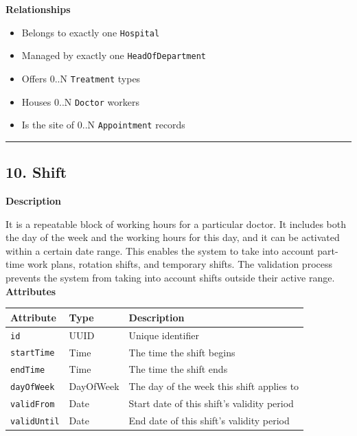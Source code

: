 \documentclass[12pt, a4paper]{article}
\begin{document}
\textbf{Relationships}

\begin{itemize}
    \item Belongs to exactly one \texttt{Hospital}
    \item Managed by exactly one \texttt{HeadOfDepartment}
    \item Offers 0..N \texttt{Treatment} types
    \item Houses 0..N \texttt{Doctor} workers
    \item Is the site of 0..N \texttt{Appointment} records
\end{itemize}

\par\medskip\hrule\medskip

\subsection{10. Shift}\label{sec:10-shift}

\textbf{Description}

It is a repeatable block of working hours for a particular doctor. It includes both the day of the week and the working hours for this day, and it can be activated within a certain date range. This enables the system to take into account part-time work plans, rotation shifts, and temporary shifts. The validation process prevents the system from taking into account shifts outside their active range.
\textbf{Attributes}

\begin{center}
\small
\renewcommand{\arraystretch}{1.35}
\begin{tabularx}{\textwidth}{|>{\raggedright\arraybackslash}p{3.4cm}|>{\raggedright\arraybackslash}p{3.3cm}|Y|}
\hline
{}
\textbf{Attribute} & \textbf{Type} & \textbf{Description} \\ \hline
\texttt{id} & UUID & Unique identifier \\ \hline
\texttt{startTime} & Time & The time the shift begins \\ \hline
\texttt{endTime} & Time & The time the shift ends \\ \hline
\texttt{dayOfWeek} & DayOfWeek & The day of the week this shift applies to \\ \hline
\texttt{validFrom} & Date & Start date of this shift's validity period \\ \hline
\texttt{validUntil} & Date & End date of this shift's validity period \\ \hline
\end{tabularx}
\end{center}
\end{document}

